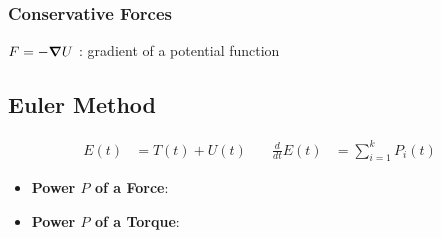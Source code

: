     \subsubsection{Conservative Forces}
        $
            F = - \grad U %
        $ : gradient of a potential function
       
    \subsection{Euler Method}
        \vspace{-1em}
        \begin{align*}
            E(t) &= T(t) + U(t) &\quad \frac{d}{dt}E(t) &= \sum_{i=1}^k P_i(t)
        \end{align*}

        \begin{itemize}
            \item  \textbf{Power $P$ of a Force}: \phantom{o} 
            \item  \textbf{Power $P$ of a Torque}: 
        \end{itemize}
    
       

            
            
